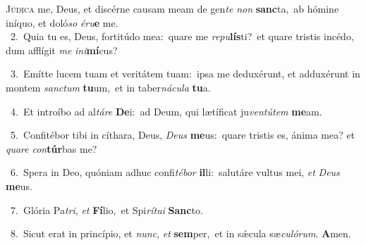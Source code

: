 \lettrine{\initial\textcolor{\initialcolor}{J}}{údica} me, Deus, et discérne causam meam de gen\textit{te} \textit{non} \textbf{sanc}\-ta,~\star ab hómine iníquo, et doló\textit{so} \textit{é}\-\textit{ru}\textbf{e} me.\\
{\numbfont\textcolor{\numbcolor}{~2.}}~Quia tu es, Deus, fortitúdo mea:~\dagger quare me \textit{re}\-\textit{pu}\textbf{lís}ti?~\star et quare tristis incédo, dum afflígit \textit{me} \textit{in}\-\textit{i}\textbf{mí}cus?\par
{\numbfont\textcolor{\numbcolor}{~3.}}~Emítte lucem tuam et veritátem tuam:~\dagger ipsa me deduxérunt, et adduxérunt in montem \textit{sanc}\-\textit{tum} \textbf{tu}\-um,~\star et in taber\-\textit{ná}\-\textit{cu}\textit{la} \textbf{tu}\-a.\par
{\numbfont\textcolor{\numbcolor}{~4.}}~Et introíbo ad al\-\textit{tá}\-\textit{re} \textbf{De}\-i:~\star ad Deum, qui lætíficat ju\-\textit{ven}\-\textit{tú}\textit{tem} \textbf{me}\-am.\par
{\numbfont\textcolor{\numbcolor}{~5.}}~Confitébor tibi in cíthara, Deus, \textit{De}\-\textit{us} \textbf{me}\-us:~\star quare tristis es, ánima mea? et \textit{qua}\-\textit{re} \textit{con}\-\textbf{túr}bas me?\par
{\numbfont\textcolor{\numbcolor}{~6.}}~Spera in Deo, quóniam adhuc confi\-\textit{té}\-\textit{bor} \textbf{il}\-li:~\star salutáre vultus mei, \textit{et} \textit{De}\-\textit{us} \textbf{me}\-us.\par
{\numbfont\textcolor{\numbcolor}{~7.}}~Glória Pa\-\textit{tri}\-, \textit{et} \textbf{Fí}\-lio,~\star et Spi\-\textit{rí}\-\textit{tu}\textit{i} \textbf{Sanc}\-to.\par
{\numbfont\textcolor{\numbcolor}{~8.}}~Sicut erat in princípio, et \textit{nunc}\-, \textit{et} \textbf{sem}\-per,~\star et in sǽcula sæ\-\textit{cu}\-\textit{ló}\textit{rum}. \textbf{A}\-men.\par
